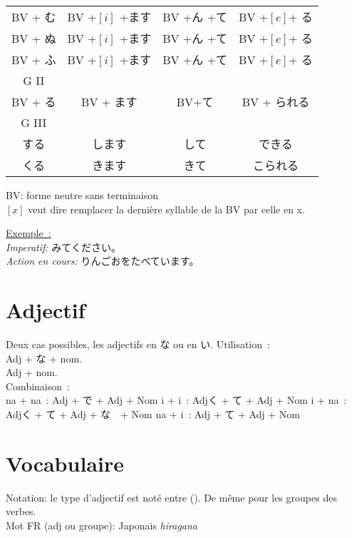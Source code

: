 \documentclass{article}
\begin{document}
\begin{CJK}{UTF8}{min}
\begin{center}
\begin{tabular} {|c|c|c|c|}
    BV + む      & BV +$[i]$ +ます &BV +ん +て    &BV +$[e]$+ る\\ 
    BV + ぬ      & BV +$[i]$ +ます &BV +ん +て    &BV +$[e]$+ る\\ 
    BV + ふ      & BV +$[i]$ +ます &BV +ん +て    &BV +$[e]$+ る\\ 
    \hline
    G II&&&\\
    BV + る & BV + ます & BV+て & BV + られる\\
    \hline
    G III&&&\\
    する &します & して & できる\\
    くる & きます & きて  & こられる\\
    \hline
\end{tabular}
\end{center}
BV: forme neutre sans terminaison\\
$[x]$ veut dire remplacer la dernière syllable de la BV par celle en x.\\

\par
\underline{Exemple~:} \\
\textit{Imperatif:} みてください。\\
\textit{Action en cours:} りんごおをたべています。

\end{CJK}
\section{Adjectif}
\begin{CJK}{UTF8}{min}
Deux cas possibles, les adjectifs en な ou en い.
Utilisation~:\\
Adj + な + nom. \\
Adj + nom. \\

Combinaison~:\\
na + na~: Adj + で + Adj + Nom
i + i~: Adjく + て + Adj + Nom
i + na~: Adjく + て + Adj + な　+ Nom
na + i~: Adj	+ て + Adj + Nom


\end{CJK}
\newpage
\section{Vocabulaire}
Notation: le type d'adjectif est noté entre (). De même pour les groupes des verbes.\\
Mot FR (adj ou groupe): Japonais \textit{hiragana}
\end{document}
